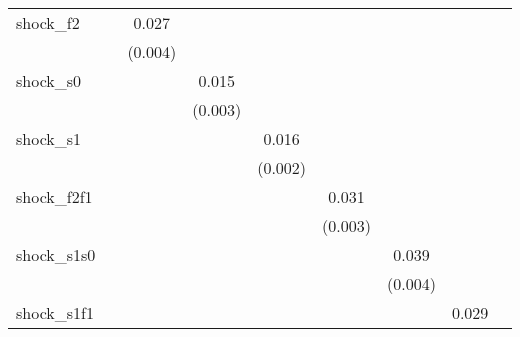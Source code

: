 {\begin{tabular}{l*{8}{c}}
\addlinespace
shock\_f2    &                     &       0.027\sym{***}&                     &                     &                     &                     &                     &                     \\
            &                     &     (0.004)         &                     &                     &                     &                     &                     &                     \\
\addlinespace
shock\_s0    &                     &                     &       0.015\sym{***}&                     &                     &                     &                     &                     \\
            &                     &                     &     (0.003)         &                     &                     &                     &                     &                     \\
\addlinespace
shock\_s1    &                     &                     &                     &       0.016\sym{***}&                     &                     &                     &                     \\
            &                     &                     &                     &     (0.002)         &                     &                     &                     &                     \\
\addlinespace
shock\_f2f1  &                     &                     &                     &                     &       0.031\sym{***}&                     &                     &                     \\
            &                     &                     &                     &                     &     (0.003)         &                     &                     &                     \\
\addlinespace
shock\_s1s0  &                     &                     &                     &                     &                     &       0.039\sym{***}&                     &                     \\
            &                     &                     &                     &                     &                     &     (0.004)         &                     &                     \\
\addlinespace
shock\_s1f1  &                     &                     &                     &                     &                     &                     &       0.029\sym{***}&                     \\

\end{tabular}}
